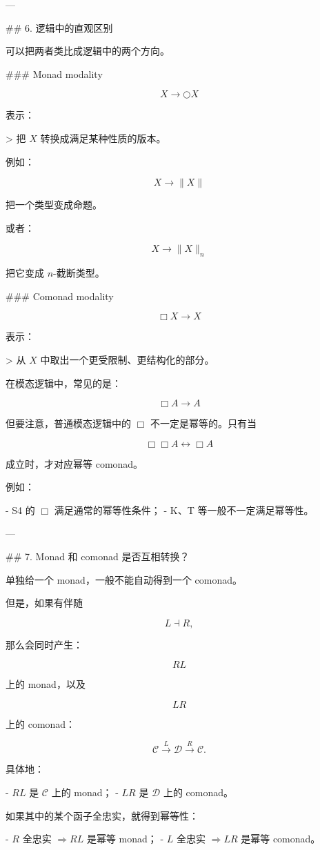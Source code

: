 \documentclass{ctexart}
\begin{document}
\begin{markdown}
---

## 6. 逻辑中的直观区别

可以把两者类比成逻辑中的两个方向。

### Monad modality

$$
X\to \bigcirc X
$$

表示：

> 把 $X$ 转换成满足某种性质的版本。

例如：

$$
X\to \|X\|
$$

把一个类型变成命题。

或者：

$$
X\to \|X\|_n
$$

把它变成 $n$-截断类型。

### Comonad modality

$$
\Box X\to X
$$

表示：

> 从 $X$ 中取出一个更受限制、更结构化的部分。

在模态逻辑中，常见的是：

$$
\Box A\to A
$$

但要注意，普通模态逻辑中的 $\Box$ 不一定是幂等的。只有当

$$
\Box\Box A\leftrightarrow \Box A
$$

成立时，才对应幂等 comonad。

例如：

- S4 的 $\Box$ 满足通常的幂等性条件；
- K、T 等一般不一定满足幂等性。

---

## 7. Monad 和 comonad 是否互相转换？

单独给一个 monad，一般不能自动得到一个 comonad。

但是，如果有伴随

$$
L\dashv R,
$$

那么会同时产生：

$$
RL
$$

上的 monad，以及

$$
LR
$$

上的 comonad：

$$
\mathcal C
\overset{L}{\longrightarrow}
\mathcal D
\overset{R}{\longrightarrow}
\mathcal C.
$$

具体地：

- $RL$ 是 $\mathcal C$ 上的 monad；
- $LR$ 是 $\mathcal D$ 上的 comonad。

如果其中的某个函子全忠实，就得到幂等性：

- $R$ 全忠实 $\Rightarrow RL$ 是幂等 monad；
- $L$ 全忠实 $\Rightarrow LR$ 是幂等 comonad。


\end{markdown}
\end{document}
